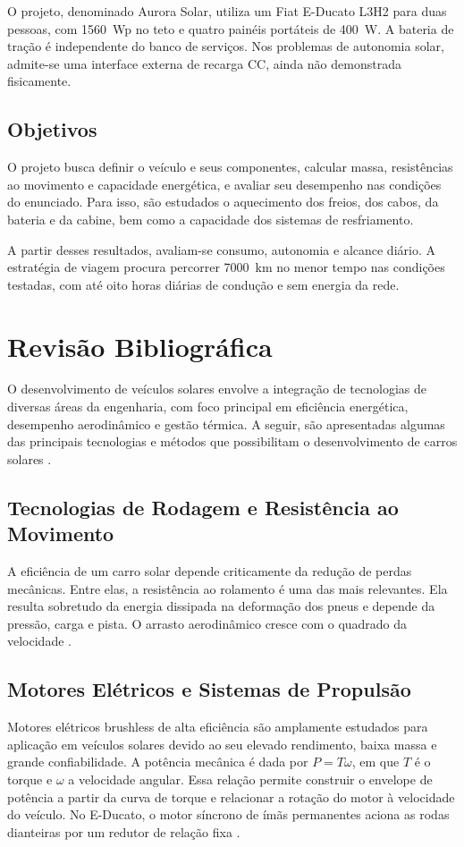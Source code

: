 \documentclass[12pt,a4paper]{article}
\begin{document}
O projeto, denominado Aurora Solar, utiliza um Fiat E-Ducato L3H2 para duas pessoas,
com \SI{1560}{Wp} no teto e quatro painéis portáteis de \SI{400}{W}. A bateria de tração
é independente do banco de serviços. Nos problemas de autonomia solar, admite-se uma
interface externa de recarga CC, ainda não demonstrada fisicamente.

\subsection{Objetivos}
O projeto busca definir o veículo e seus componentes, calcular massa, resistências ao
movimento e capacidade energética, e avaliar seu desempenho nas condições do enunciado.
Para isso, são estudados o aquecimento dos freios, dos cabos, da bateria e da cabine,
bem como a capacidade dos sistemas de resfriamento.

A partir desses resultados, avaliam-se consumo, autonomia e alcance diário. A estratégia
de viagem procura percorrer \SI{7000}{km} no menor tempo nas condições testadas,
com até oito horas diárias de condução e sem energia da rede.

\clearpage
\section{Revisão Bibliográfica}
O desenvolvimento de veículos solares envolve a integração de tecnologias de diversas
áreas da engenharia, com foco principal em eficiência energética, desempenho aerodinâmico
e gestão térmica. A seguir, são apresentadas algumas das principais tecnologias e métodos
que possibilitam o desenvolvimento de carros solares \cite{cuca}.

\subsection{Tecnologias de Rodagem e Resistência ao Movimento}
A eficiência de um carro solar depende criticamente da redução de perdas mecânicas.
Entre elas, a resistência ao rolamento é uma das mais relevantes. Ela resulta sobretudo
da energia dissipada na deformação dos pneus e depende da pressão, carga e pista.
O arrasto aerodinâmico cresce com o quadrado da velocidade \cite{gillespie,hucho}.

\subsection{Motores Elétricos e Sistemas de Propulsão}
Motores elétricos brushless de alta eficiência são amplamente estudados para aplicação
em veículos solares devido ao seu elevado rendimento, baixa massa e grande confiabilidade.
A potência mecânica é dada por $P=T\omega$, em que $T$ é o torque e $\omega$ a
velocidade angular. Essa relação permite construir o envelope de potência a partir
da curva de torque e relacionar a rotação do motor à velocidade do veículo.
No E-Ducato, o motor síncrono de ímãs permanentes aciona as rodas dianteiras por um
redutor de relação fixa \cite{fiatsk,fiatde}.
\end{document}
